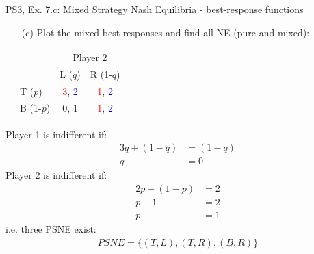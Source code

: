 \begin{frame}{PS3, Ex. 7.c: Mixed Strategy Nash Equilibria - best-response functions}
  \begin{multicols}{2}
    \begin{itemize}
      \item[(c)] Plot the mixed best responses and find all NE (pure and mixed):
    \end{itemize}
    \begin{table}
      \begin{tabular}{cl|c|c|}
        & \multicolumn{1}{c}{} & \multicolumn{2}{c}{\color{blue}Player 2}\\
        \parbox[t]{1mm}{}
        &  &  &  \\
        & T  ($p$)  & \textcolor{red}{3}, \textcolor{blue}{2} & \textcolor{red}{1}, \textcolor{blue}{2} \\
        & B  (1-$p$)& 0, 1 & \textcolor{red}{1}, \textcolor{blue}{2} \\
      \end{tabular}
    \end{table}
    Player 1 is indifferent if:
    \begin{align*}
      3q+(1-q) &= (1-q) \\
      q &= 0
    \end{align*}
    Player 2 is indifferent if:
    \begin{align*}
      2p + (1-p) &= 2 \\
      p + 1      &= 2 \\
      p          &= 1
    \end{align*}
    i.e. three PSNE exist:
    \begin{align*}
      PSNE=\{(T,L),(T,R),(B,R)\}
    \end{align*}
  \vfill\null \columnbreak
  \vfill\null
  \end{multicols}
\end{frame}
